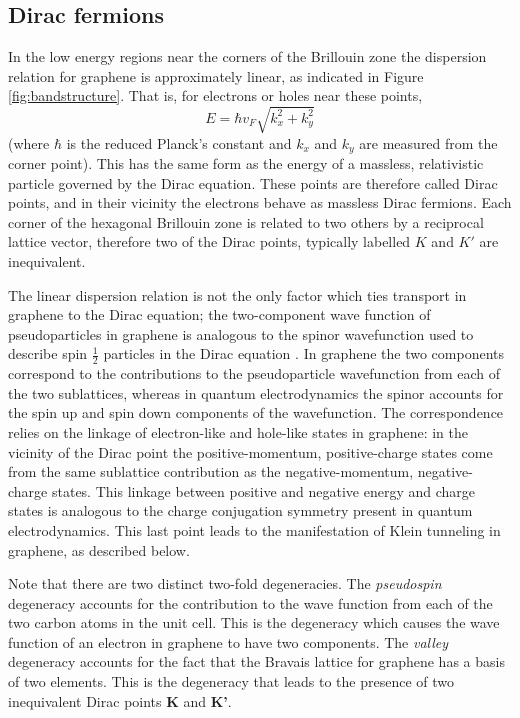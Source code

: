 \documentclass[edeposit,fullpage,draftthesis]{uiucthesis2009}
\begin{document}
    
    \subsection{Dirac fermions}
    	
        In the low energy regions near the corners of the Brillouin zone the dispersion relation for graphene is approximately linear, as indicated in Figure \ref{fig:bandstructure}. That is, for electrons or holes near these points,
        \begin{equation}
        E = \hbar v_F \sqrt{k_x^2 + k_y^2}
        \end{equation}
        (where $\hbar$ is the reduced Planck's constant and $k_x$ and $k_y$ are measured from the corner point). This has the same form as the energy of a massless, relativistic particle governed by the Dirac equation. These points are therefore called Dirac points, and in their vicinity the electrons behave as massless Dirac fermions. Each corner of the hexagonal Brillouin zone is related to two others by a reciprocal lattice vector, therefore two of the Dirac points, typically labelled $K$ and $K'$ are inequivalent.
    
        The linear dispersion relation is not the only factor which ties transport in graphene to the Dirac equation; the two-component wave function of pseudoparticles in graphene is analogous to the spinor wavefunction used to describe spin $\frac{1}{2}$ particles in the Dirac equation \cite{Katsnelson2006}. In graphene the two components correspond to the contributions to the pseudoparticle wavefunction from each of the two sublattices, whereas in quantum electrodynamics the spinor accounts for the spin up and spin down components of the wavefunction.
        The correspondence relies on the linkage of electron-like and hole-like states in graphene:
        in the vicinity of the Dirac point the positive-momentum, positive-charge states come from
        the same sublattice contribution as the negative-momentum, negative-charge states. 
        This linkage between positive and negative energy and charge states is analogous
        to the charge conjugation symmetry present in quantum electrodynamics.
        This last point leads to the manifestation of Klein tunneling in graphene, as described below.
    
        Note that there are two distinct two-fold degeneracies. The \textit{pseudospin} degeneracy
        accounts for the contribution to the wave function from each of the two carbon atoms in
        the unit cell. This is the degeneracy which causes the wave function of an electron in graphene
        to have two components.
        The \textit{valley} degeneracy accounts for the fact that the Bravais lattice for graphene
        has a basis of two elements. This is the degeneracy that leads to the presence
        of two inequivalent Dirac points \textbf{K} and \textbf{K'}. 
         
\end{document}
